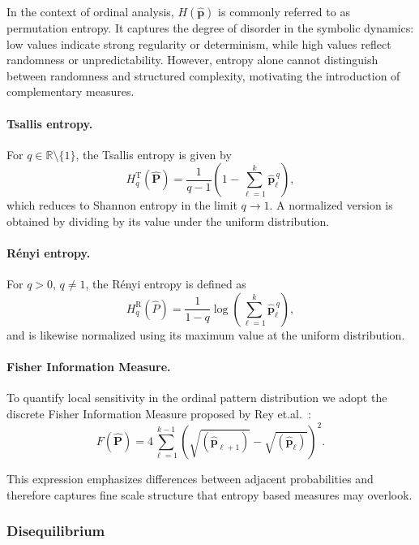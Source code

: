\documentclass[12pt,a4paper]{article}
\begin{document}
In the context of ordinal analysis, \(H(\widehat{\mathbf{p}})\) is commonly referred to as permutation entropy. It captures the degree of disorder in the symbolic dynamics: low values indicate strong regularity or determinism, while high values reflect randomness or
unpredictability. However, entropy alone cannot distinguish between randomness and structured complexity, motivating the introduction of complementary measures.

\paragraph{Tsallis entropy.}
For $q \in \mathbb{R}\setminus\{1\}$, the Tsallis entropy is given by
\[
H^{\mathrm{T}}_{q}(\widehat{\mathbf P})
= \frac{1}{q-1}\left(1 - \sum_{\ell=1}^{k} \widehat{\mathbf p}_\ell^{\,q}\right),
\]
which reduces to Shannon entropy in the limit $q \to 1$.  
A normalized version is obtained by dividing by its value under the uniform distribution.

\paragraph{Rényi entropy.}
For $q>0$, $q\neq 1$, the Rényi entropy is defined as
\[
H^{\mathrm{R}}_{q}(\widehat{P})
= \frac{1}{1-q}\log\!\left(\sum_{\ell=1}^{k} \widehat{\mathbf p}_\ell^{\,q}\right),
\]
and is likewise normalized using its maximum value at the uniform distribution.

\paragraph{Fisher Information Measure.}
To quantify local sensitivity in the ordinal pattern distribution we adopt the discrete Fisher Information Measure proposed by Rey et.al.~\cite{Rey2024Asymptotic}:
\[
F(\widehat{\mathbf P})
= 4\sum_{\ell=1}^{k-1}
(\sqrt{(\widehat{\mathbf p}_{\ell+1})}-\sqrt{(\widehat{\mathbf p}_{\ell})})^{2}.
\]

This expression emphasizes differences between adjacent probabilities and therefore captures fine scale structure that entropy based measures may overlook.

\subsubsection{Disequilibrium}\label{disequilibrium}
\end{document}
